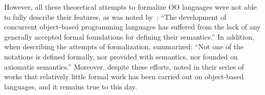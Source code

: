 However, all these theoretical attempts to formalize OO languages
were not able to fully describe their features, as was noted
by~\citet{nierstrasz1991towards}:
``The development of concurrent object-based programming languages
has suffered from the lack of any generally accepted formal
foundations for defining their semantics.'' In addition, when describing the
attempts of formalization, \citet{eden2002visual} summarized: ``Not one of the
notations is defined formally, nor provided with
 semantics,
nor founded on axiomatic semantics.''
%
Moreover, despite these efforts,
\citet{ciaffaglione2003reasoning,ciaffaglione2003typetheories,ciaffaglione2007theory_of_contexts}
noted in their series of works that relatively little formal work has
been carried out on object-based languages, and it remains true to this day.

